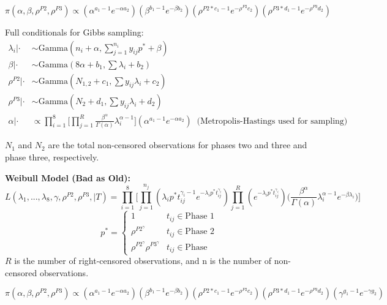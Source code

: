 \documentclass[12pt]{article}
\begin{document}
\begin{equation*}
\pi(\alpha, \beta, \rho^{P2}, \rho^{P3}) \propto (\alpha^{a_1-1}e^{-\alpha
  a_2})(\beta^{b_1 - 1}e^{-\beta b_2})(\rho^{P2*c_1 - 1}e^{-\rho^{P2}
  c_2})(\rho^{P3*d_1 - 1}e^{-\rho^{P3} d_2})
\end{equation*}

Full conditionals for Gibbs sampling:
\begin{align*}
\lambda_i|\cdot &\sim \text{Gamma}(n_i + \alpha, \sum_{j=1}^{n_i}y_{ij}p^* + \beta) \\
\beta|\cdot &\sim \text{Gamma}(8\alpha + b_1, \sum{\lambda_i} + b_2) \\
\rho^{P2}|\cdot &\sim \text{Gamma}(N_{1,2} + c_1, \sum{y_{ij}\lambda_i} + c_2) \\
\rho^{P3}|\cdot &\sim \text{Gamma}(N_{2} + d_1, \sum{y_{ij}\lambda_i} + d_2) \\
\alpha|\cdot &\propto \prod_{i = 1}^8 \Bigg[\prod_{j =1}^R \frac{\beta^\alpha}{\Gamma(\alpha)}\lambda_i^{\alpha -
  1}\Bigg] (\alpha^{a_1-1}e^{-\alpha a_2}) \;\; \text{(Metropolis-Hastings used for sampling)}
\end{align*}

$N_1$ and $N_2$ are the total non-censored observations for phases two and three
and phase three, respectively.

\textbf{Weibull Model (Bad as Old):}
\begin{equation*}
  L(\lambda_1, ..., \lambda_8, \gamma, \rho^{P2}, \rho^{P3}, \vert T) = \prod_{i =
    1}^8 \Bigg[\prod_{j = 1}^{n_j}(\lambda_i p^*t_{ij}^{\gamma_i-1} e^{-\lambda_i
    p^* t_{ij}^{\gamma_i}})\prod_{j = 1}^R(e^{-\lambda_i p^*
    t_{ij}^{\gamma_i}})\Big(\frac{\beta^\alpha}{\Gamma(\alpha)}\lambda_i^{\alpha -
    1}e^{-\beta\lambda_i}\Big)\Bigg]
\end{equation*}
\[p^* =   \left\{
\begin{array}{ll}
      1 & t_{ij}\in \text{Phase 1} \\
      \rho^{P2^\gamma} & t_{ij} \in \text{Phase 2} \\
      \rho^{P2^\gamma} \rho^{P3^\gamma} & t_{ij} \in \text{Phase }
\end{array}
\right. \]
$R$ is the number of right-censored observations, and n is the number of
non-censored observations.

\begin{equation*}
\pi(\alpha, \beta, \rho^{P2}, \rho^{P3}) \propto (\alpha^{a_1-1}e^{-\alpha
  a_2})(\beta^{b_1 - 1}e^{-\beta b_2})(\rho^{P2*c_1 - 1}e^{-\rho^{P2}
  c_2})(\rho^{P3 * d_1 - 1}e^{-\rho^{P3} d_2})(\gamma^{g_1 - 1}e^{-\gamma g_2})
\end{equation*}
\end{document}
